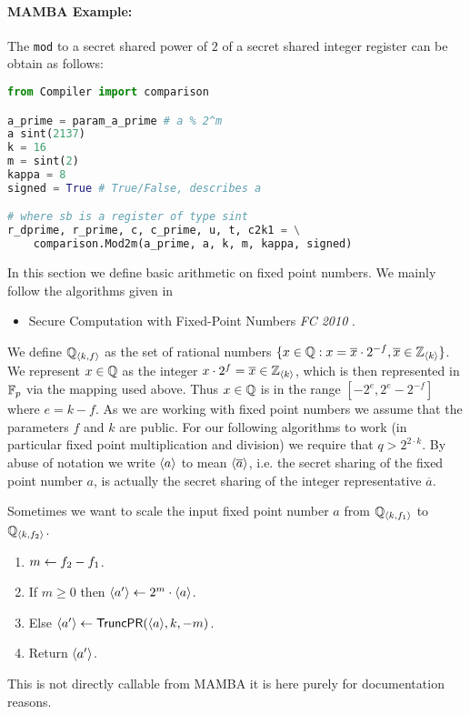 \paragraph{MAMBA Example:} The \verb|mod| to a secret shared power of $2$ of a secret shared integer register can be obtain as follows: 
\begin{lstlisting}[language={python}]
from Compiler import comparison

a_prime = param_a_prime # a % 2^m
a sint(2137)
k = 16
m = sint(2)
kappa = 8  
signed = True # True/False, describes a

# where sb is a register of type sint
r_dprime, r_prime, c, c_prime, u, t, c2k1 = \
    comparison.Mod2m(a_prime, a, k, m, kappa, signed)
\end{lstlisting}


In this section we define basic arithmetic on fixed
point numbers.
We mainly follow the algorithms given in 
\begin{itemize}
\item Secure Computation with Fixed-Point Numbers {\em FC 2010} \cite{CS10}.
\end{itemize}
We define ${\mathbb{Q}}_{\langle k, f \rangle}$ as the set of rational numbers
$\{x \in {\mathbb{Q}}: x = \overline{x} \cdot 2^{-f}, \overline{x} \in {\mathbb{Z}}_{\langle k \rangle}\}$.
We represent $x \in {\mathbb{Q}}$ as the integer $x \cdot 2^f = \overline{x} \in {\mathbb{Z}}_{\langle k \rangle}$,
which is then represented in ${\mathbb{F}}_p$ via the mapping used above.
Thus $x \in {\mathbb{Q}}$ is in the range $[-2^e,2^e-2^{-f}]$
where $e=k-f$.
As we are working with fixed point numbers we assume that the
parameters $f$ and $k$ are public.
For our following algorithms to work (in particular fixed point
multiplication and division) we require that $q>2^{2 \cdot k}$.
By abuse of notation we write $\langle a \rangle$ to mean $\langle \overline{a} \rangle$,
i.e. the secret sharing of the fixed point number $a$,
is actually the secret sharing of the integer representative
$\overline{a}$.

Sometimes we want to scale the input fixed point number $a$
from ${\mathbb{Q}}_{\langle k, f_1 \rangle}$ to ${\mathbb{Q}}_{\langle k, f_2 \rangle}$.
\begin{enumerate}
\item $m \leftarrow f_2-f_1$.
\item If $m\ge 0$ then $\langle a' \rangle \leftarrow 2^m \cdot \langle a \rangle$.
\item Else $\langle a' \rangle \leftarrow \mathsf{TruncPR}(\langle a \rangle,k,-m)$.
\item Return $\langle a' \rangle$.
\end{enumerate}
This is not directly callable from MAMBA it is here purely
for documentation reasons.

